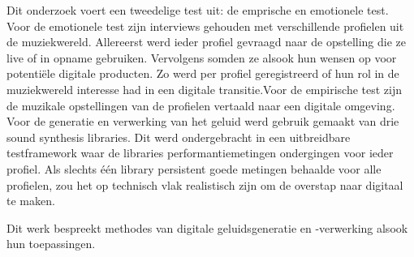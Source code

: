 Dit onderzoek voert een tweedelige test uit: de emprische en emotionele test. Voor de emotionele test zijn interviews gehouden met verschillende profielen uit de muziekwereld. Allereerst werd ieder profiel gevraagd naar de opstelling die ze live of in opname gebruiken. Vervolgens somden ze alsook hun wensen op voor potentiële digitale producten. Zo werd per profiel geregistreerd of hun rol in de muziekwereld interesse had in een digitale transitie.\newline Voor de empirische test zijn de muzikale opstellingen van de profielen vertaald naar een digitale omgeving. Voor de generatie en verwerking van het geluid werd gebruik gemaakt van drie sound synthesis libraries. Dit werd ondergebracht in een uitbreidbare testframework waar de libraries performantiemetingen ondergingen voor ieder profiel. Als slechts één library persistent goede metingen behaalde voor alle profielen, zou het op technisch vlak realistisch zijn om de overstap naar digitaal te maken.

Dit werk bespreekt methodes van digitale geluidsgeneratie en -verwerking alsook hun toepassingen. 

